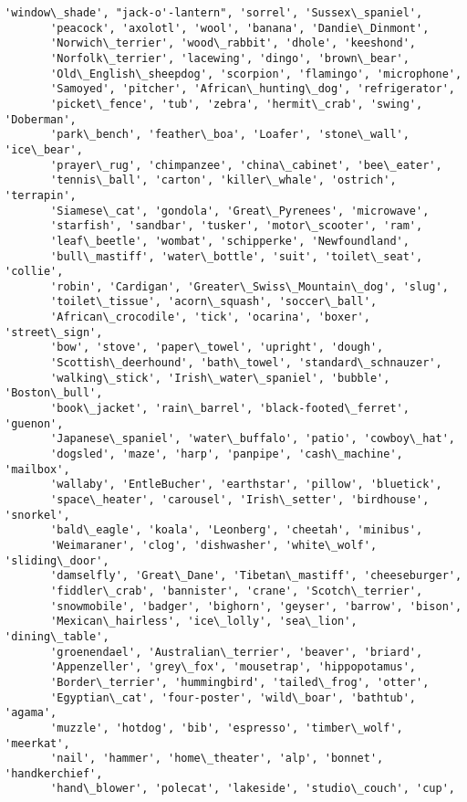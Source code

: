 \documentclass[11pt]{article}
\begin{document}
\begin{tcolorbox}[breakable, size=fbox, boxrule=.5pt, pad at break*=1mm, opacityfill=0]
\begin{Verbatim}[commandchars=\\\{\}]
       'window\_shade', "jack-o'-lantern", 'sorrel', 'Sussex\_spaniel',
       'peacock', 'axolotl', 'wool', 'banana', 'Dandie\_Dinmont',
       'Norwich\_terrier', 'wood\_rabbit', 'dhole', 'keeshond',
       'Norfolk\_terrier', 'lacewing', 'dingo', 'brown\_bear',
       'Old\_English\_sheepdog', 'scorpion', 'flamingo', 'microphone',
       'Samoyed', 'pitcher', 'African\_hunting\_dog', 'refrigerator',
       'picket\_fence', 'tub', 'zebra', 'hermit\_crab', 'swing', 'Doberman',
       'park\_bench', 'feather\_boa', 'Loafer', 'stone\_wall', 'ice\_bear',
       'prayer\_rug', 'chimpanzee', 'china\_cabinet', 'bee\_eater',
       'tennis\_ball', 'carton', 'killer\_whale', 'ostrich', 'terrapin',
       'Siamese\_cat', 'gondola', 'Great\_Pyrenees', 'microwave',
       'starfish', 'sandbar', 'tusker', 'motor\_scooter', 'ram',
       'leaf\_beetle', 'wombat', 'schipperke', 'Newfoundland',
       'bull\_mastiff', 'water\_bottle', 'suit', 'toilet\_seat', 'collie',
       'robin', 'Cardigan', 'Greater\_Swiss\_Mountain\_dog', 'slug',
       'toilet\_tissue', 'acorn\_squash', 'soccer\_ball',
       'African\_crocodile', 'tick', 'ocarina', 'boxer', 'street\_sign',
       'bow', 'stove', 'paper\_towel', 'upright', 'dough',
       'Scottish\_deerhound', 'bath\_towel', 'standard\_schnauzer',
       'walking\_stick', 'Irish\_water\_spaniel', 'bubble', 'Boston\_bull',
       'book\_jacket', 'rain\_barrel', 'black-footed\_ferret', 'guenon',
       'Japanese\_spaniel', 'water\_buffalo', 'patio', 'cowboy\_hat',
       'dogsled', 'maze', 'harp', 'panpipe', 'cash\_machine', 'mailbox',
       'wallaby', 'EntleBucher', 'earthstar', 'pillow', 'bluetick',
       'space\_heater', 'carousel', 'Irish\_setter', 'birdhouse', 'snorkel',
       'bald\_eagle', 'koala', 'Leonberg', 'cheetah', 'minibus',
       'Weimaraner', 'clog', 'dishwasher', 'white\_wolf', 'sliding\_door',
       'damselfly', 'Great\_Dane', 'Tibetan\_mastiff', 'cheeseburger',
       'fiddler\_crab', 'bannister', 'crane', 'Scotch\_terrier',
       'snowmobile', 'badger', 'bighorn', 'geyser', 'barrow', 'bison',
       'Mexican\_hairless', 'ice\_lolly', 'sea\_lion', 'dining\_table',
       'groenendael', 'Australian\_terrier', 'beaver', 'briard',
       'Appenzeller', 'grey\_fox', 'mousetrap', 'hippopotamus',
       'Border\_terrier', 'hummingbird', 'tailed\_frog', 'otter',
       'Egyptian\_cat', 'four-poster', 'wild\_boar', 'bathtub', 'agama',
       'muzzle', 'hotdog', 'bib', 'espresso', 'timber\_wolf', 'meerkat',
       'nail', 'hammer', 'home\_theater', 'alp', 'bonnet', 'handkerchief',
       'hand\_blower', 'polecat', 'lakeside', 'studio\_couch', 'cup',

\end{Verbatim}
\end{tcolorbox}
\end{document}
